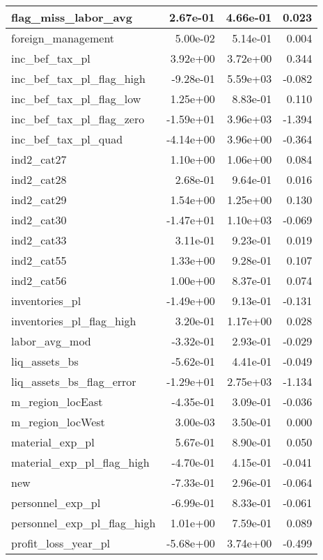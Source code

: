 \begin{table}
\begin{tabular}[t]{l|r|r|r}
\hline
flag\_miss\_labor\_avg & 2.67e-01 & 4.66e-01 & 0.023\\
\hline
foreign\_management & 5.00e-02 & 5.14e-01 & 0.004\\
\hline
inc\_bef\_tax\_pl & 3.92e+00 & 3.72e+00 & 0.344\\
\hline
inc\_bef\_tax\_pl\_flag\_high & -9.28e-01 & 5.59e+03 & -0.082\\
\hline
inc\_bef\_tax\_pl\_flag\_low & 1.25e+00 & 8.83e-01 & 0.110\\
\hline
inc\_bef\_tax\_pl\_flag\_zero & -1.59e+01 & 3.96e+03 & -1.394\\
\hline
inc\_bef\_tax\_pl\_quad & -4.14e+00 & 3.96e+00 & -0.364\\
\hline
ind2\_cat27 & 1.10e+00 & 1.06e+00 & 0.084\\
\hline
ind2\_cat28 & 2.68e-01 & 9.64e-01 & 0.016\\
\hline
ind2\_cat29 & 1.54e+00 & 1.25e+00 & 0.130\\
\hline
ind2\_cat30 & -1.47e+01 & 1.10e+03 & -0.069\\
\hline
ind2\_cat33 & 3.11e-01 & 9.23e-01 & 0.019\\
\hline
ind2\_cat55 & 1.33e+00 & 9.28e-01 & 0.107\\
\hline
ind2\_cat56 & 1.00e+00 & 8.37e-01 & 0.074\\
\hline
inventories\_pl & -1.49e+00 & 9.13e-01 & -0.131\\
\hline
inventories\_pl\_flag\_high & 3.20e-01 & 1.17e+00 & 0.028\\
\hline
labor\_avg\_mod & -3.32e-01 & 2.93e-01 & -0.029\\
\hline
liq\_assets\_bs & -5.62e-01 & 4.41e-01 & -0.049\\
\hline
liq\_assets\_bs\_flag\_error & -1.29e+01 & 2.75e+03 & -1.134\\
\hline
m\_region\_locEast & -4.35e-01 & 3.09e-01 & -0.036\\
\hline
m\_region\_locWest & 3.00e-03 & 3.50e-01 & 0.000\\
\hline
material\_exp\_pl & 5.67e-01 & 8.90e-01 & 0.050\\
\hline
material\_exp\_pl\_flag\_high & -4.70e-01 & 4.15e-01 & -0.041\\
\hline
new & -7.33e-01 & 2.96e-01 & -0.064\\
\hline
personnel\_exp\_pl & -6.99e-01 & 8.33e-01 & -0.061\\
\hline
personnel\_exp\_pl\_flag\_high & 1.01e+00 & 7.59e-01 & 0.089\\
\hline
profit\_loss\_year\_pl & -5.68e+00 & 3.74e+00 & -0.499\\

\end{tabular}
\end{table}
